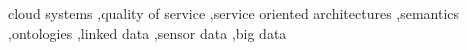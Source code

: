 \documentclass[preprint,12pt]{elsarticle}
\begin{document}
\begin{frontmatter}
\begin{keyword}
cloud systems \sep quality of service \sep  service oriented architectures \sep  semantics \sep  ontologies \sep  linked data \sep  sensor data \sep  big data 


\end{keyword}


\end{frontmatter}


%

% 

%

\end{document}
